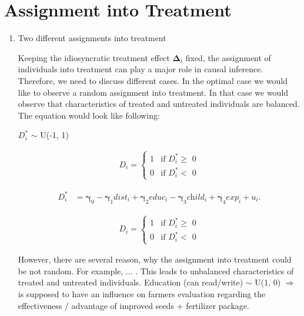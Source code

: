 \section{Assignment into Treatment} \label{sec:assignment}

\begin{enumerate}
\item Two different assignments into treatment

Keeping the idiosyncratic treatment effect $\boldsymbol{\Delta}_i$ fixed, the assignment of individuals into treatment can play a major role in causal inference. Therefore, we need to discuss different cases. In the optimal case we would like to observe a random assignment into treatment. In that case we would observe that characteristics of treated and untreated individuals are balanced. The equation would look like following:

$\textit{D}_i^\ast$ $\sim$ U(-1, 1)

\begin{align*}
  \textit{D}_i =
    \begin{cases}
      1 & \text{if $\textit{D}_i^\ast \geq$ 0}\\
      0 & \text{if $\textit{D}_i^\ast <$ 0}
    \end{cases}       
\end{align*}

\begin{align}
	\label{eq:eq1}
	\textit{D}_i^\ast &= \boldsymbol{\gamma}_0 - \boldsymbol{\gamma}_1 \textit{dist}_i + \boldsymbol{\gamma}_2 \textit{educ}_i -  \boldsymbol{\gamma}_3 \textit{child}_i + \boldsymbol{\gamma}_4 \textit{exp}_i  + \textit{u}_i.
\end{align}

 

\begin{align*}
  \textit{D}_i =
    \begin{cases}
      1 & \text{if $\textit{D}_i^\ast \geq$ 0}\\
      0 & \text{if $\textit{D}_i^\ast <$ 0}
    \end{cases}       
\end{align*}



However, there are several reason, why the assignment into treatment could be not random. For example, ... . This leads to unbalanced characteristics of treated and untreated individuals. 
Education (can read/write) $\sim$ U(1, 0) $\Rightarrow$ is supposed to have an influence on farmers evaluation regarding the effectiveness / advantage of improved seeds + fertilizer package.



\end{enumerate}
